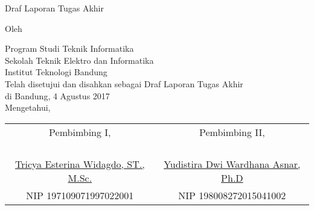 \clearpage
\pagestyle{empty}

\begin{center}
\smallskip

    \Large \bfseries \MakeUppercase{\thetitle}
    \vfill

    \Large Draf Laporan Tugas Akhir
    \vfill

    \large Oleh

    \Large \theauthor

    \large Program Studi Teknik Informatika \\
    \normalsize \normalfont
    Sekolah Teknik Elektro dan Informatika \\
    Institut Teknologi Bandung \\

    \vfill
    \normalsize \normalfont
    Telah disetujui dan disahkan sebagai Draf Laporan Tugas Akhir \\ di Bandung, 4 Agustus 2017 \\
    Mengetahui,

    \vfill
    \setlength{\tabcolsep}{12pt}
    \begin{tabular}{c@{\hskip 0.5in}c}
        Pembimbing I, & Pembimbing II, \\
        & \\
        & \\
        & \\
        & \\
        \underline{Tricya Esterina Widagdo, ST., M.Sc.} & \underline{Yudistira Dwi Wardhana Asnar, Ph.D} \\
        NIP 197109071997022001 & NIP 198008272015041002 \\
    \end{tabular}

\end{center}
\clearpage

